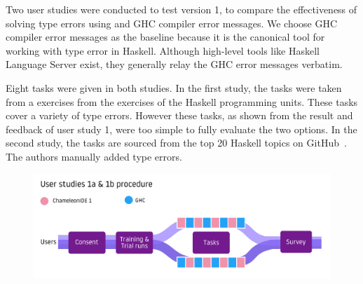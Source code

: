 Two user studies were conducted to test \chameleon{} version 1, to compare the effectiveness of solving type errors using \chameleon{} and GHC compiler error messages. We choose GHC compiler error messages as the baseline because it is the canonical tool for working with type error in Haskell. Although high-level tools like Haskell Language Server exist, they generally relay the GHC error messages verbatim. 


Eight tasks were given in both studies. In the first study, the tasks were taken from a exercises from the exercises of the Haskell programming units. These tasks cover a variety of type errors.  However these tasks, as shown from the result and feedback of user study 1, were too simple to fully evaluate the two options. In the second study, the tasks are sourced from the top 20 Haskell topics on GitHub~\cite{githubHaskell}. The authors manually added type errors. 

\begin{figure}[h]
    \centering
    \includegraphics[width=\linewidth]{images/procedure-1.pdf}
    \caption{}
    \label{fig:study-process}
\end{figure}




